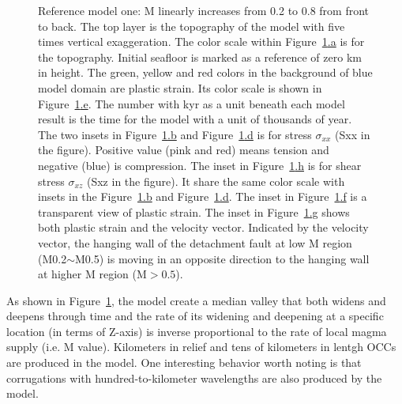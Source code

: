 \begin{figure}[hc]
  \caption{Reference model one: M linearly increases from 0.2 to 0.8 from front to back. The top layer is the topography of the model with five times vertical exaggeration. The color scale within Figure~\hyperref[fig_Results1_1]{\ref{fig_Results1_1}.a} is for the topography. Initial seafloor is marked as a reference of zero km in height.  The green, yellow and red colors in the background of blue model domain are plastic strain. Its color scale is shown in Figure~\hyperref[fig_Results1_1]{\ref{fig_Results1_1}.e}. The number with kyr as a unit beneath each model result is the time for the model with a unit of thousands of year. The two insets in Figure~\hyperref[fig_Results1_1]{\ref{fig_Results1_1}.b} and Figure~\hyperref[fig_Results1_1]{\ref{fig_Results1_1}.d} is for stress $\sigma_{xx}$ (Sxx in the figure). Positive value (pink and red) means tension and negative (blue) is compression. The inset in Figure~\hyperref[fig_Results1_1]{\ref{fig_Results1_1}.h} is for shear stress $\sigma_{xz}$ (Sxz in the figure). It share the same color scale with insets in the Figure~\hyperref[fig_Results1_1]{\ref{fig_Results1_1}.b} and Figure~\hyperref[fig_Results1_1]{\ref{fig_Results1_1}.d}. The inset in Figure~\hyperref[fig_Results1_1]{\ref{fig_Results1_1}.f} is a transparent view of plastic strain. The inset in Figure~\hyperref[fig_Results1_1]{\ref{fig_Results1_1}.g} shows both plastic strain and the velocity vector. Indicated by the velocity vector, the hanging wall of the detachment fault at low M region (M0.2$\sim$M0.5) is moving in an opposite direction to the hanging wall at higher M region (M$>0.5$).} %
 \label{fig_Results1_1}
\end{figure}   

As shown in Figure~\hyperref[fig_Results1_1]{\ref{fig_Results1_1}}, the model create a median valley that both widens and deepens through time and the rate of its widening and deepening at a specific location (in terms of Z-axis) is inverse proportional to the rate of local magma supply (i.e. M value). Kilometers in relief and tens of kilometers in lentgh OCCs are produced in the model. One interesting behavior worth noting is that corrugations with hundred-to-kilometer wavelengths are also produced by the model.

